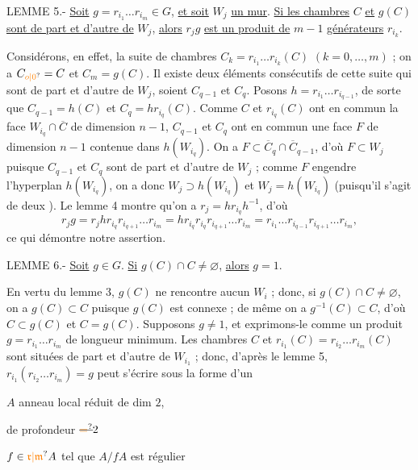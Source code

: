 LEMME 5.- \uline{Soit} $g=r_{i_1}\ldots r_{i_m}\in G$, \uline{et soit} $W_j$ \uline{un mur}. \uline{Si les chambres} $C$ \uline{et} $g(C)$ \uline{sont de part et d'autre de} $W_j$, \uline{alors} $r_j g$ \uline{est un produit de} $m-1$ \uline{générateurs} $r_{i_k}$.

Considérons, en effet, la suite de chambres $C_k=r_{i_1}\ldots r_{i_k}(C)$ $(k=0,\ldots,m)$ ; on a $C_{\unsure{o|0}}=C$ et $C_m=g(C)$. Il existe deux éléments consécutifs de cette suite qui sont de part et d'autre de $W_j$, soient $C_{q-1}$ et $C_q$. Posons $h=r_{i_1}\ldots r_{i_{q-1}}$, de sorte que $C_{q-1}=h(C)$ et $C_q=hr_{i_q}(C)$. Comme $C$ et $r_{i_q}(C)$ ont en commun la face $W_{i_q}\cap\overline C$ de dimension $n-1$, $C_{q-1}$ et $C_q$ ont en commun une face $F$ de dimension $n-1$ contenue dans $h(W_{i_q})$. On a $F\subset\overline C_q\cap\overline C_{q-1}$, d'où $F\subset W_j$ puisque $C_{q-1}$ et $C_q$ sont de part et d'autre de $W_j$ ; comme $F$ engendre l'hyperplan $h(W_{i_q})$, on a donc $W_j\supset h(W_{i_q})$ et $W_j=h(W_{i_q})$ (puisqu'il s'agit de deux ). Le lemme 4 montre qu'on a $r_j=hr_{i_q}h^{-1}$, d'où
\[
r_jg=r_jhr_{i_q}r_{i_{q+1}}\ldots r_{i_m}
=hr_{i_q}r_{i_q}r_{i_{q+1}}\ldots r_{i_m}
=r_{i_1}\ldots r_{i_{q-1}}r_{i_{q+1}}\ldots r_{i_m},
\]
ce qui démontre notre assertion.

LEMME 6.- \uline{Soit} $g\in G$. \uline{Si} $g(C)\cap C\ne\varnothing$, \uline{alors} $g=1$.

En vertu du lemme 3, $g(C)$ ne rencontre aucun $W_i$ ; donc, si $g(C)\cap C\ne\varnothing$, on a $g(C)\subset C$ puisque $g(C)$ est connexe ; de même on a $g^{-1}(C)\subset C$, d'où $C\subset g(C)$ et $C=g(C)$. Supposons $g\ne1$, et exprimons-le comme un produit $g=r_{i_1}\ldots r_{i_m}$ de longueur minimum. Les chambres $C$ et $r_{i_1}(C)=r_{i_2}\ldots r_{i_m}(C)$ sont situées de part et d'autre de $W_{i_1}$ ; donc, d'après le lemme 5, $r_{i_1}(r_{i_2}\ldots r_{i_m})=g$ peut s'écrire sous la forme d'un

$A$ anneau local  réduit de dim $2$,

de profondeur $\deleted{\unsure{=}}2$

$f\in\unsure{\mathfrak r|\mathfrak m}A$ tel que $A/fA$ est régulier

\noindent{}

